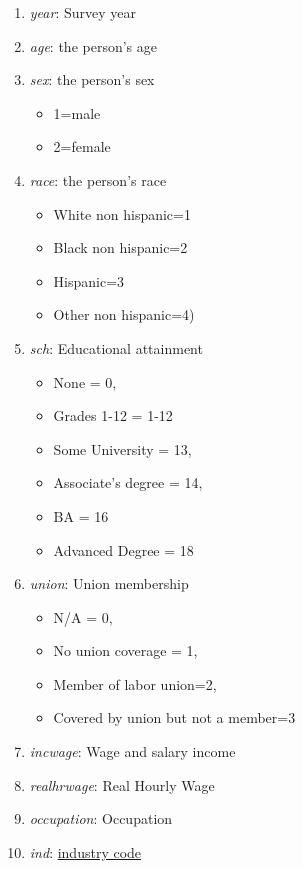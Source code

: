 \documentclass[
  letterpaper,
  DIV=11,
  numbers=noendperiod]{scrreprt}
\providecommand{\tightlist}{%
  \setlength{\itemsep}{0pt}\setlength{\parskip}{0pt}}\usepackage{longtable,booktabs,array}
\begin{document}
\begin{enumerate}
\def\labelenumi{\arabic{enumi}.}
\tightlist
\item
  \emph{year}: Survey year
\item
  \emph{age}: the person's age
\item
  \emph{sex}: the person's sex

  \begin{itemize}
  \tightlist
  \item
    1=male
  \item
    2=female
  \end{itemize}
\item
  \emph{race}: the person's race

  \begin{itemize}
  \tightlist
  \item
    White non hispanic=1
  \item
    Black non hispanic=2
  \item
    Hispanic=3
  \item
    Other non hispanic=4)
  \end{itemize}
\item
  \emph{sch}: Educational attainment

  \begin{itemize}
  \tightlist
  \item
    None = 0,
  \item
    Grades 1-12 = 1-12
  \item
    Some University = 13,
  \item
    Associate's degree = 14,
  \item
    BA = 16
  \item
    Advanced Degree = 18
  \end{itemize}
\item
  \emph{union}: Union membership

  \begin{itemize}
  \tightlist
  \item
    N/A = 0,
  \item
    No union coverage = 1,
  \item
    Member of labor union=2,
  \item
    Covered by union but not a member=3
  \end{itemize}
\item
  \emph{incwage}: Wage and salary income
\item
  \emph{realhrwage}: Real Hourly Wage
\item
  \emph{occupation}: Occupation
\item
  \emph{ind}:
  \href{https://www.census.gov/naics/?58967?yearbck=2002}{industry code}
\end{enumerate}
\end{document}
